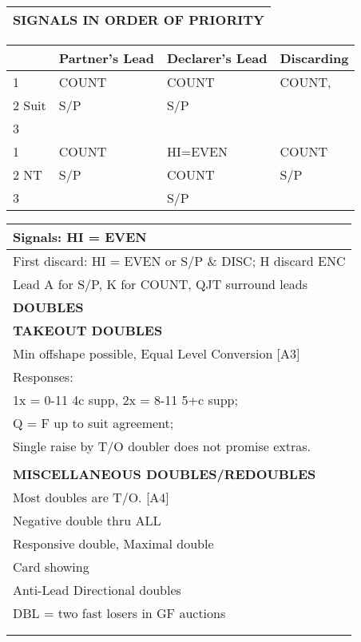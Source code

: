 \documentclass{article}
\begin{document}
\begin{minipage}{90mm}
\begin{tabular}{| p{88mm} |}
		\cellcolor{orange!25}\textbf{SIGNALS IN ORDER OF PRIORITY} \\ \hline
	\end{tabular}
	\begin{tabular}{| p{8.9mm} | p{22mm} | p{22mm} | p{22mm} |}
		& Partner's Lead & Declarer's Lead & Discarding \\ \hline
		1 & COUNT & COUNT & COUNT, \\ \hline
		2 Suit & S/P & S/P& \\ \hline
		3 & & & \\ \hline
		1 & COUNT & HI=EVEN & COUNT \\ \hline
		2 NT & S/P & COUNT & S/P \\ \hline
		3 & & S/P & \\ \hline
	\end{tabular}
	\begin{tabular}{| p{88mm} |}
		Signals: HI = EVEN\\ \hline
		First discard: HI = EVEN or S/P \& DISC; H discard ENC\\ \hline
		Lead A for S/P, K for COUNT, QJT surround leads\\ \hline %
		\cellcolor{green!25} \textbf{DOUBLES} \\ \hline
		\cellcolor{orange!25}\textbf{TAKEOUT DOUBLES} \\ \hline
		Min offshape possible, Equal Level Conversion [A3]\\ \hline
		Responses:\\ \hline
		1x = 0-11 4c supp, 2x = 8-11 5+c supp;\\ \hline
		Q = F up to suit agreement;\\ \hline
		Single raise by T/O doubler does not promise extras.\\ \hline
		\\ \hline
		\cellcolor{orange!25}\textbf{MISCELLANEOUS DOUBLES/REDOUBLES} \\ \hline
		Most doubles are T/O. [A4]\\ \hline
		Negative double thru ALL\\ \hline
		Responsive double, Maximal double\\ \hline
		Card showing\\ \hline
		Anti-Lead Directional doubles\\ \hline
		DBL = two fast losers in GF auctions\\ \hline
		\\ \hline
		\\ \hline
	\end{tabular}
\end{minipage}
\end{document}
